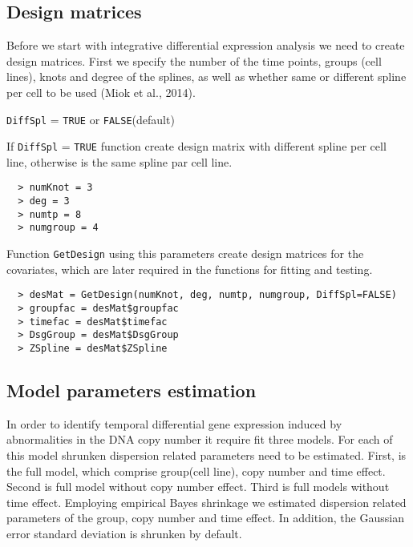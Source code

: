 \documentclass[a4paper]{article}
\begin{document}
\subsection{Design matrices}
Before we start with integrative differential expression analysis we need to create design matrices. First we specify the number of the time points, groups (cell lines), knots and degree of the splines, as well as whether same or different spline per cell to be used (Miok et al., 2014).
\begin{compactitem}
\item {\tt DiffSpl} = {\tt TRUE} or {\tt FALSE}(default) \\
\end{compactitem}
If {\tt DiffSpl} = {\tt TRUE} function create design matrix with different spline per cell line, otherwise is the same spline par cell line.

\begin{verbatim}
  > numKnot = 3    
  > deg = 3         
  > numtp = 8      
  > numgroup = 4  
\end{verbatim}

  Function {\tt GetDesign} using this parameters create design matrices for the covariates, which are later required in the functions for fitting and testing.
\begin{verbatim}
  > desMat = GetDesign(numKnot, deg, numtp, numgroup, DiffSpl=FALSE)
  > groupfac = desMat$groupfac
  > timefac = desMat$timefac
  > DsgGroup = desMat$DsgGroup
  > ZSpline = desMat$ZSpline
\end{verbatim}

\subsection{Model parameters estimation}

In order to identify temporal differential gene expression induced by abnormalities in the DNA copy number it require fit three models. For each of this model shrunken dispersion related parameters need to be estimated. First, is the full model, which comprise group(cell line), copy number and time effect. Second is full model without copy number effect. Third is full models without time effect. Employing empirical Bayes shrinkage we estimated dispersion related parameters of the group, copy number and time effect. In addition, the Gaussian error standard deviation is shrunken by default. 
\end{document}

